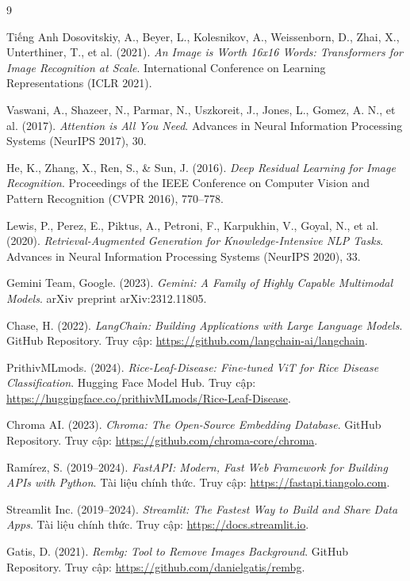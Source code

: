 \documentclass{uetgraduation}
\begin{document}
\begin{thebibliography}{9}
\begin{bibsection}{Tiếng Anh}
Dosovitskiy, A., Beyer, L., Kolesnikov, A., Weissenborn, D., Zhai, X., Unterthiner, T., et al. (2021). \textit{An Image is Worth 16x16 Words: Transformers for Image Recognition at Scale}. International Conference on Learning Representations (ICLR 2021).

Vaswani, A., Shazeer, N., Parmar, N., Uszkoreit, J., Jones, L., Gomez, A. N., et al. (2017). \textit{Attention is All You Need}. Advances in Neural Information Processing Systems (NeurIPS 2017), 30.

He, K., Zhang, X., Ren, S., \& Sun, J. (2016). \textit{Deep Residual Learning for Image Recognition}. Proceedings of the IEEE Conference on Computer Vision and Pattern Recognition (CVPR 2016), 770--778.

Lewis, P., Perez, E., Piktus, A., Petroni, F., Karpukhin, V., Goyal, N., et al. (2020). \textit{Retrieval-Augmented Generation for Knowledge-Intensive NLP Tasks}. Advances in Neural Information Processing Systems (NeurIPS 2020), 33.

Gemini Team, Google. (2023). \textit{Gemini: A Family of Highly Capable Multimodal Models}. arXiv preprint arXiv:2312.11805.

Chase, H. (2022). \textit{LangChain: Building Applications with Large Language Models}. GitHub Repository. Truy cập: \url{https://github.com/langchain-ai/langchain}.

PrithivMLmods. (2024). \textit{Rice-Leaf-Disease: Fine-tuned ViT for Rice Disease Classification}. Hugging Face Model Hub. Truy cập: \url{https://huggingface.co/prithivMLmods/Rice-Leaf-Disease}.

Chroma AI. (2023). \textit{Chroma: The Open-Source Embedding Database}. GitHub Repository. Truy cập: \url{https://github.com/chroma-core/chroma}.

Ramírez, S. (2019--2024). \textit{FastAPI: Modern, Fast Web Framework for Building APIs with Python}. Tài liệu chính thức. Truy cập: \url{https://fastapi.tiangolo.com}.

Streamlit Inc. (2019--2024). \textit{Streamlit: The Fastest Way to Build and Share Data Apps}. Tài liệu chính thức. Truy cập: \url{https://docs.streamlit.io}.

Gatis, D. (2021). \textit{Rembg: Tool to Remove Images Background}. GitHub Repository. Truy cập: \url{https://github.com/danielgatis/rembg}.


\end{bibsection}
\end{thebibliography}
\end{document}
